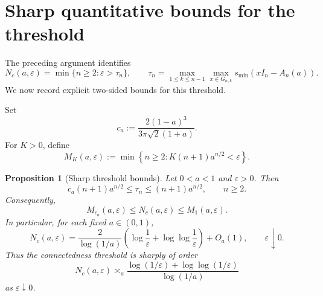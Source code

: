 \documentclass[11pt]{amsart}
\numberwithin{equation}{section}
\newcommand{\eps}{\varepsilon}
\newtheorem{proposition}[theorem]{Proposition}
\begin{document}
\section{Sharp quantitative bounds for the threshold}

The preceding argument identifies
\[
N_c(a,\eps)=\min\{n\ge2:\eps>\tau_n\},
\qquad
\tau_n=\max_{1\le k\le n-1}\max_{x\in G_{n,k}}
s_{\min}(xI_n-A_n(a)).
\]
We now record explicit two-sided bounds for this threshold.

Set
\begin{equation}\label{eq:ca-def}
c_a:=\frac{2(1-a)^3}{3\pi\sqrt2(1+a)}.
\end{equation}
For \(K>0\), define
\begin{equation}\label{eq:MK-def}
M_K(a,\eps)
:=
\min\left\{
n\ge2:K(n+1)a^{n/2}<\eps
\right\}.
\end{equation}

\begin{proposition}[Sharp threshold bounds]\label{prop:sharp-threshold-bounds}
Let \(0<a<1\) and \(\eps>0\).  Then
\begin{equation}\label{eq:tau-two-sided}
c_a(n+1)a^{n/2}
\le
\tau_n
\le
(n+1)a^{n/2},
\qquad n\ge2.
\end{equation}
Consequently,
\begin{equation}\label{eq:Nc-two-sided}
M_{c_a}(a,\eps)
\le
N_c(a,\eps)
\le
M_1(a,\eps).
\end{equation}
In particular, for each fixed \(a\in(0,1)\),
\begin{equation}\label{eq:Nc-asymptotic}
N_c(a,\eps)
=
\frac{2}{\log(1/a)}
\left(
\log\frac1\eps+\log\log\frac1\eps
\right)
+
O_a(1),
\qquad \eps\downarrow0.
\end{equation}
Thus the connectedness threshold is sharply of order
\[
N_c(a,\eps)
\asymp_a
\frac{\log(1/\eps)+\log\log(1/\eps)}{\log(1/a)}
\]
as \(\eps\downarrow0\).
\end{proposition}
\end{document}
